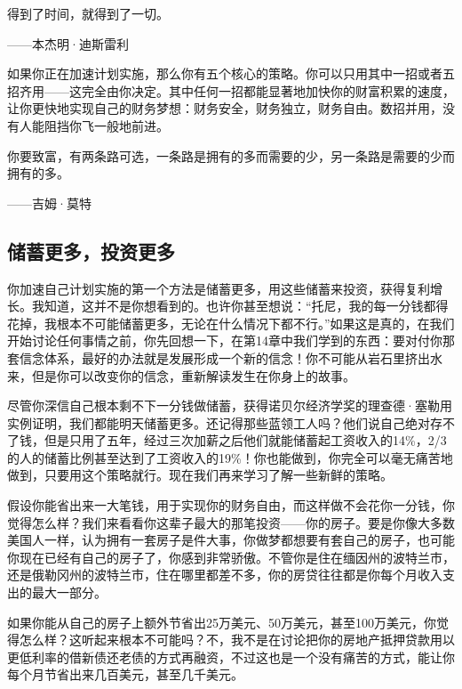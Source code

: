 \begin{BookQuote}
得到了时间，就得到了一切。

\hfill ——本杰明·迪斯雷利
\end{BookQuote}

如果你正在加速计划实施，那么你有五个核心的策略。你可以只用其中一招或者五招齐用——这完全由你决定。其中任何一招都能显著地加快你的财富积累的速度，让你更快地实现自己的财务梦想：财务安全，财务独立，财务自由。数招并用，没有人能阻挡你飞一般地前进。

\begin{BookQuote}
你要致富，有两条路可选，一条路是拥有的多而需要的少，另一条路是需要的少而拥有的多。

\hfill ——吉姆·莫特
\end{BookQuote}

\subsection{储蓄更多，投资更多}

你加速自己计划实施的第一个方法是储蓄更多，用这些储蓄来投资，获得复利增长。我知道，这并不是你想看到的。也许你甚至想说：“托尼，我的每一分钱都得花掉，我根本不可能储蓄更多，无论在什么情况下都不行。”如果这是真的，在我们开始讨论任何事情之前，你先回想一下，在第14章中我们学到的东西：要对付你那套信念体系，最好的办法就是发展形成一个新的信念！你不可能从岩石里挤出水来，但是你可以改变你的信念，重新解读发生在你身上的故事。

尽管你深信自己根本剩不下一分钱做储蓄，获得诺贝尔经济学奖的理查德·塞勒用实例证明，我们都能明天储蓄更多。还记得那些蓝领工人吗？他们说自己绝对存不了钱，但是只用了五年，经过三次加薪之后他们就能储蓄起工资收入的14\%，2/3的人的储蓄比例甚至达到了工资收入的19\%！你也能做到，你完全可以毫无痛苦地做到，只要用这个策略就行。现在我们再来学习了解一些新鲜的策略。

假设你能省出来一大笔钱，用于实现你的财务自由，而这样做不会花你一分钱，你觉得怎么样？我们来看看你这辈子最大的那笔投资——你的房子。要是你像大多数美国人一样，认为拥有一套房子是件大事，你做梦都想要有套自己的房子，也可能你现在已经有自己的房子了，你感到非常骄傲。不管你是住在缅因州的波特兰市，还是俄勒冈州的波特兰市，住在哪里都差不多，你的房贷往往都是你每个月收入支出的最大一部分。

如果你能从自己的房子上额外节省出25万美元、50万美元，甚至100万美元，你觉得怎么样？这听起来根本不可能吗？不，我不是在讨论把你的房地产抵押贷款用以更低利率的借新债还老债的方式再融资，不过这也是一个没有痛苦的方式，能让你每个月节省出来几百美元，甚至几千美元。


